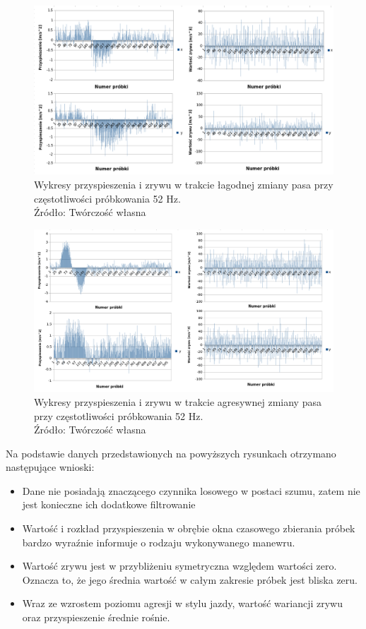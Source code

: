 \begin{figure}[H]
	\centering
	\includegraphics[width=15cm]{img/driving_analysis/lagodna_zmiana_pasa_52.png}
	\caption{Wykresy przyspieszenia i zrywu w trakcie łagodnej zmiany pasa przy częstotliwości próbkowania 52 Hz.
	\\Źródło: Twórczość własna}
	\label{fig:image_driving_analysis_test_acc_light_lane_52Hz}
\end{figure}

\begin{figure}[H]
	\centering
	\includegraphics[width=15cm]{img/driving_analysis/ostra_zmiana_pasa_52.png}
	\caption{Wykresy przyspieszenia i zrywu w trakcie agresywnej zmiany pasa przy częstotliwości próbkowania 52 Hz.
	\\Źródło: Twórczość własna}
	\label{fig:image_driving_analysis_test_acc_hard_lane_52Hz}
\end{figure}

\clearpage
Na podstawie danych przedstawionych na powyższych rysunkach otrzymano następujące wnioski:

\begin{itemize}
\item Dane nie posiadają znaczącego czynnika losowego w postaci szumu, zatem nie jest konieczne ich dodatkowe filtrowanie
\item Wartość i rozkład przyspieszenia w obrębie okna czasowego zbierania próbek bardzo wyraźnie informuje o rodzaju wykonywanego manewru.
\item Wartość zrywu jest w przybliżeniu symetryczna względem wartości zero. Oznacza to, że jego średnia wartość w całym zakresie próbek jest bliska zeru.
\item Wraz ze wzrostem poziomu agresji w stylu jazdy, wartość wariancji zrywu oraz przyspieszenie średnie rośnie. 
\end{itemize}

